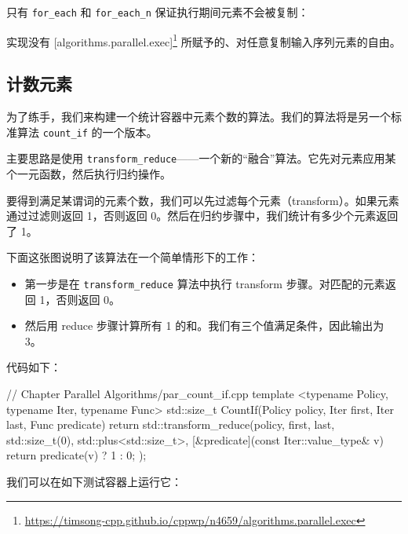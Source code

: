 只有 \texttt{for\_each} 和 \texttt{for\_each\_n} 保证执行期间元素不会被复制：

实现没有 [algorithms.parallel.exec]\footnote{\url{https://timsong-cpp.github.io/cppwp/n4659/algorithms.parallel.exec}} 所赋予的、对任意复制输入序列元素的自由。


\subsection{计数元素}

为了练手，我们来构建一个统计容器中元素个数的算法。我们的算法将是另一个标准算法 \texttt{count\_if} 的一个版本。

主要思路是使用 \texttt{transform\_reduce}——一个新的“融合”算法。它先对元素应用某个一元函数，然后执行归约操作。

要得到满足某谓词的元素个数，我们可以先过滤每个元素（transform）。如果元素通过过滤则返回 1，否则返回 0。然后在归约步骤中，我们统计有多少个元素返回了 1。

下面这张图说明了该算法在一个简单情形下的工作：


\begin{itemize}
\item 第一步是在 \texttt{transform\_reduce} 算法中执行 transform 步骤。对匹配的元素返回 1，否则返回 0。
\item 然后用 reduce 步骤计算所有 1 的和。我们有三个值满足条件，因此输出为 3。
\end{itemize}

代码如下：

\begin{codebox}[cpp]
// Chapter Parallel Algorithms/par_count_if.cpp
template <typename Policy, typename Iter, typename Func>
std::size_t CountIf(Policy policy, Iter first, Iter last, Func predicate)
{
return std::transform_reduce(policy,
first,
last,
std::size_t(0),
std::plus<std::size_t>{},
[&predicate](const Iter::value_type& v) {
return predicate(v) ? 1 : 0;
}
);
}
\end{codebox}

我们可以在如下测试容器上运行它：


